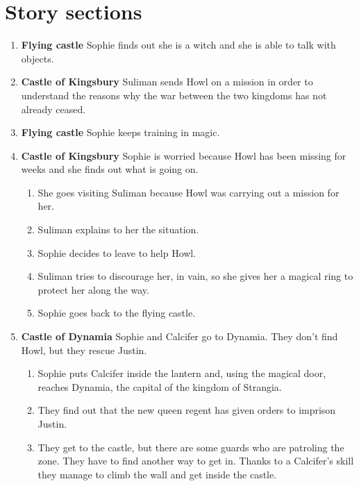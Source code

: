 \section{Story sections}

\begin{enumerate}
\item \textbf{Flying castle} Sophie finds out she is a witch and she is able to talk with objects.
  
\item \textbf{Castle of Kingsbury} Suliman sends Howl on a mission in order to understand the reasons why the war between the two kingdoms has not already ceased.
  
\item \textbf{Flying castle} Sophie keeps training in magic.
  
\item \textbf{Castle of Kingsbury} Sophie is worried because Howl has been missing for weeks and she finds out what is going on.
  \begin{enumerate}
  \item She goes visiting Suliman because Howl was carrying out a mission for her.
    
  \item Suliman explains to her the situation.

  \item Sophie decides to leave to help Howl.

  \item Suliman tries to discourage her, in vain, so she gives her a magical ring to protect her along the way.

  \item Sophie goes back to the flying castle.
  \end{enumerate}

\item \textbf{Castle of Dynamia} Sophie and Calcifer go to Dynamia. They don't find Howl, but they rescue Justin.

  \begin{enumerate}
  \item Sophie puts Calcifer inside the lantern and, using the magical door, reaches Dynamia, the capital of the kingdom of Strangia.
    
  \item They find out that the new queen regent has given orders to imprison Justin.
    
  \item They get to the castle, but there are some guards who are patroling the zone. They have to find another way to get in. Thanks to a Calcifer’s skill they manage to climb the wall and get inside the castle.
    

\end{enumerate}
\end{enumerate}
